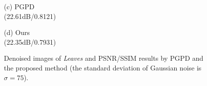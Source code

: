 \documentclass[runningheads]{llncs}
\begin{document}
\begin{figure}
{\begin{minipage}[t]{0.244\textwidth}
{\footnotesize (c) PGPD \\(22.61dB/0.8121)}
\end{minipage}
\begin{minipage}[t]{0.244\textwidth}
\centering
{}
{\footnotesize (d) Ours \\(22.35dB/0.7931)}
\end{minipage}
}
\caption{Denoised images of \textsl{Leaves} and PSNR/SSIM results by PGPD and the proposed method (the standard deviation of Gaussian noise is $\sigma=75$).}
\label{fig29}
\end{figure}

\end{document}
